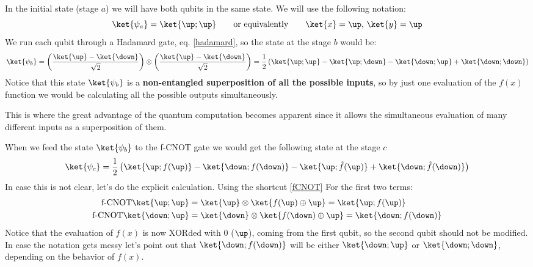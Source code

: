 In the initial state (stage $a$) we will have both qubits in the same state. We will use the following notation:
\begin{equation}
  \ket{\psi_{a}} = \ket{\up;\up} \qquad\text{or equivalently}\qquad
  \ket{x}=\up\text{, }\ket{y}=\up
\end{equation}
We run each qubit through a Hadamard gate, eq. \eqref{hadamard}, so the state at the stage $b$ would be:
\begin{equation}
  \ket{\psi_{b}} =
  \left(\frac{\ket{\up}-\ket{\down}}{\sqrt{2}}\right)\otimes
  \left(\frac{\ket{\up}-\ket{\down}}{\sqrt{2}}\right) =
  \frac{1}{2}\left(\ket{\up;\up}-\ket{\up;\down}-
  \ket{\down;\up}+\ket{\down;\down}\right)
\end{equation}
Notice that this state $\ket{\psi_b}$ is a \textbf{non-entangled superposition of all the possible inputs}, so by just one evaluation of the $f(x)$ function we would be calculating all the possible outputs simultaneously.

This is where the great advantage of the quantum computation becomes apparent since it allows the simultaneous evaluation of many different inputs as a superposition of them.

When we feed the state $\ket{\psi_b}$ to the f-CNOT gate we would get the following state at the stage $c$
\begin{equation}
  \ket{\psi_{c}} = \frac{1}{2}
  \left(\ket{\up;f(\up)} - \ket{\down;f(\down)} - \ket{\up;\tilde{f}(\up)}+
  \ket{\down;\tilde{f}(\down)} \right)
\end{equation}
In case this is not clear, let's do the explicit calculation. Using the shortcut \eqref{fCNOT}
For the first two terms:
\begin{equation}
  \begin{split}
    \text{f-CNOT}\ket{\up;\up} &=
    \ket{\up}\otimes\ket{f(\up)\oplus\up} =\ket{\up;f(\up)}\\
    \text{f-CNOT}\ket{\down;\up} &=
    \ket{\down}\otimes\ket{f(\down)\oplus \up} = \ket{\down;f(\down)}
  \end{split}
\end{equation}
Notice that the evaluation of $f(x)$ is now XORded with 0 ($\up$), coming from the first qubit, so the second qubit should not be modified.
In case the notation gets messy let's point out that $\ket{\down;f(\down)}$ will be either $\ket{\down;\up}$ or $\ket{\down;\down}$, depending on the behavior of $f(x)$.

